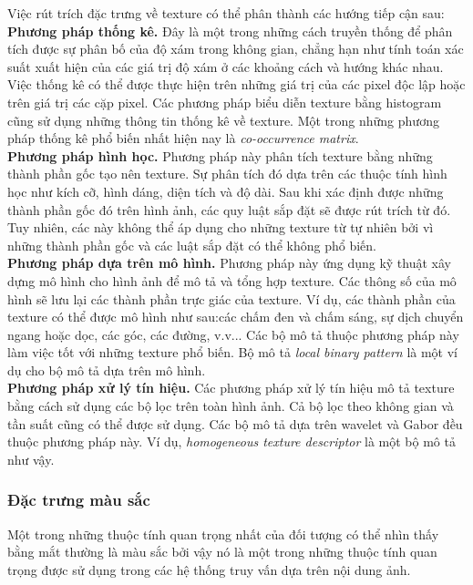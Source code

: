 Việc rút trích đặc trưng về texture có thể phân thành các hướng tiếp cận sau:\\
\textbf{Phương pháp thống kê.} Đây là một trong những cách truyền thống để phân tích được sự phân bố của độ xám trong không gian, chẳng hạn như tính toán xác suất xuất hiện của các giá trị độ xám ở các khoảng cách và hướng khác nhau. Việc thống kê có thể được thực hiện trên những giá trị của các pixel độc lập hoặc trên giá trị các cặp pixel\cite{tuceryan1998texture}. Các phương pháp biểu diễn texture bằng histogram cũng sử dụng những thông tin thống kê về texture. Một trong những phương pháp thống kê phổ biến nhất hiện nay là \textit{co-occurrence matrix}\cite{haralick1973textural}.\\
\textbf{Phương pháp hình học.} Phương pháp này phân tích texture bằng những thành phần gốc tạo nên texture. Sự phân tích đó dựa trên các thuộc tính hình học như kích cỡ, hình dáng, diện tích và độ dài. Sau khi xác định được những thành phần gốc đó trên hình ảnh, các quy luật sắp đặt sẽ được rút trích từ đó\cite{nevatia1982machine}. Tuy nhiên, các này không thể áp dụng cho những texture từ tự nhiên bởi vì những thành phần gốc và các luật sắp đặt có thể không phổ biến.\\
\textbf{Phương pháp dựa trên mô hình.} Phương pháp này ứng dụng kỹ thuật xây dựng mô hình cho hình ảnh để mô tả và tổng hợp texture. Các thông số của mô hình sẽ lưu lại các thành phần trực giác của texture\cite{tuceryan1998texture}. Ví dụ, các thành phần của texture có thể được mô hình như sau:các chấm đen và chấm sáng, sự dịch chuyển ngang hoặc dọc, các góc, các đường, v.v... Các bộ mô tả thuộc phương pháp này làm việc tốt với những texture phổ biến. Bộ mô tả \textit{local binary pattern} là một ví dụ cho bộ mô tả dựa trên mô hình.\\
\textbf{Phương pháp xử lý tín hiệu.} Các phương pháp xử lý tín hiệu mô tả texture bằng cách sử dụng các bộ lọc trên toàn hình ảnh. Cả bộ lọc theo không gian và tần suất cũng có thể được sử dụng. Các bộ mô tả dựa trên wavelet và Gabor đều thuộc phương pháp này. Ví dụ, \textit{homogeneous texture descriptor}\cite{wu2000texture, manjunath1996texture} là một bộ mô tả như vậy.

\subsubsection{Đặc trưng màu sắc}
Một trong những thuộc tính quan trọng nhất của đối tượng có thể nhìn thấy bằng mắt thường là màu sắc bởi vậy nó là một trong những thuộc tính quan trọng được sử dụng trong các hệ thống truy vấn dựa trên nội dung ảnh.

